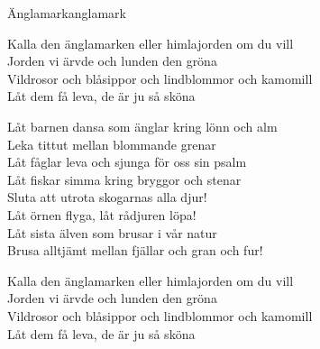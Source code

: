 \begin{song}{Änglamark}{anglamark}
\begin{vers}
Kalla den änglamarken eller himlajorden om du vill\\
Jorden vi ärvde och lunden den gröna\\
Vildrosor och blåsippor och lindblommor och kamomill\\
Låt dem få leva, de är ju så sköna\\
\end{vers}
\begin{vers}
Låt barnen dansa som änglar kring lönn och alm\\
Leka tittut mellan blommande grenar\\
Låt fåglar leva och sjunga för oss sin psalm\\
Låt fiskar simma kring bryggor och stenar\\
Sluta att utrota skogarnas alla djur!\\
Låt örnen flyga, låt rådjuren löpa!\\
Låt sista älven som brusar i vår natur\\
Brusa alltjämt mellan fjällar och gran och fur!\\
\end{vers}
\begin{vers}
Kalla den änglamarken eller himlajorden om du vill\\
Jorden vi ärvde och lunden den gröna\\
Vildrosor och blåsippor och lindblommor och kamomill\\
Låt dem få leva, de är ju så sköna\\
\end{vers}
\end{song}
